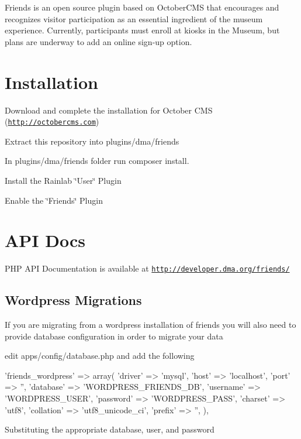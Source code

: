 Friends is an open source plugin based on October\+C\+M\+S that encourages and recognizes visitor participation as an essential ingredient of the museum experience. Currently, participants must enroll at kiosks in the Museum, but plans are underway to add an online sign-\/up option.

\section*{Installation}


\begin{DoxyItemize}
\item Download and complete the installation for October C\+M\+S (\href{http://octobercms.com}{\tt http\+://octobercms.\+com})
\item Extract this repository into plugins/dma/friends
\item In plugins/dma/friends folder run {\ttfamily composer install}.
\item Install the Rainlab \char`\"{}\+User\char`\"{} Plugin
\item Enable the \char`\"{}\+Friends\char`\"{} Plugin
\end{DoxyItemize}

\section*{A\+P\+I Docs}

P\+H\+P A\+P\+I Documentation is available at \href{http://developer.dma.org/friends/}{\tt http\+://developer.\+dma.\+org/friends/}

\subsection*{Wordpress Migrations}

If you are migrating from a wordpress installation of friends you will also need to provide database configuration in order to migrate your data


\begin{DoxyItemize}
\item edit apps/config/database.\+php and add the following 
\begin{DoxyPre}
        'friends\_wordpress' => array(
            'driver'    => 'mysql',
            'host'      => 'localhost',
            'port'      => '', 
            'database'  => 'WORDPRESS\_FRIENDS\_DB',
            'username'  => 'WORDPRESS\_USER',
            'password'  => 'WORDPRESS\_PASS',
            'charset'   => 'utf8',
            'collation' => 'utf8\_unicode\_ci',
            'prefix'    => '', 
        ), 
\end{DoxyPre}
 Substituting the appropriate database, user, and password 
\end{DoxyItemize}